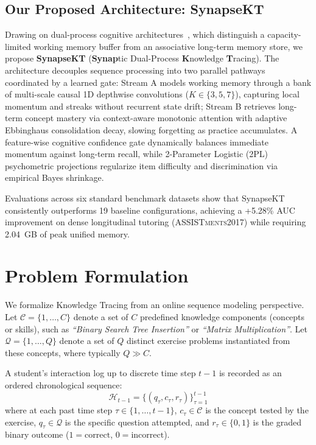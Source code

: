 \documentclass[11pt]{article}
\begin{document}
\subsection{Our Proposed Architecture: SynapseKT}

Drawing on dual-process cognitive architectures~\citep{baddeley1992working,kahneman2011thinking}, which distinguish a capacity-limited working memory buffer from an associative long-term memory store, we propose \textbf{SynapseKT} (\textbf{Synap}tic Dual-Process \textbf{K}nowledge \textbf{T}racing). The architecture decouples sequence processing into two parallel pathways coordinated by a learned gate: Stream A models working memory through a bank of multi-scale causal 1D depthwise convolutions ($K \in \{3, 5, 7\}$), capturing local momentum and streaks without recurrent state drift; Stream B retrieves long-term concept mastery via context-aware monotonic attention with adaptive Ebbinghaus consolidation decay, slowing forgetting as practice accumulates. A feature-wise cognitive confidence gate dynamically balances immediate momentum against long-term recall, while 2-Parameter Logistic (2PL) psychometric projections regularize item difficulty and discrimination via empirical Bayes shrinkage.

Evaluations across six standard benchmark datasets show that SynapseKT consistently outperforms 19 baseline configurations, achieving a +5.28\% AUC improvement on dense longitudinal tutoring (\textsc{ASSISTments2017}) while requiring 2.04~GB of peak unified memory.

\section{Problem Formulation}
\label{sec:formulation}

We formalize Knowledge Tracing from an online sequence modeling perspective. Let $\mathcal{C} = \{1, \dots, C\}$ denote a set of $C$ predefined knowledge components (concepts or skills), such as \emph{``Binary Search Tree Insertion''} or \emph{``Matrix Multiplication''}. Let $\mathcal{Q} = \{1, \dots, Q\}$ denote a set of $Q$ distinct exercise problems instantiated from these concepts, where typically $Q \gg C$.

A student's interaction log up to discrete time step $t-1$ is recorded as an ordered chronological sequence:
\begin{equation}
\mathcal{H}_{t-1} = \big\{ (q_\tau, c_\tau, r_\tau) \big\}_{\tau=1}^{t-1}
\end{equation}
where at each past time step $\tau \in \{1, \dots, t-1\}$, $c_\tau \in \mathcal{C}$ is the concept tested by the exercise, $q_\tau \in \mathcal{Q}$ is the specific question attempted, and $r_\tau \in \{0, 1\}$ is the graded binary outcome ($1 = \text{correct}$, $0 = \text{incorrect}$).
\end{document}
